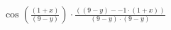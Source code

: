 $\cos({\frac{({1}+{x})}{({9}-{y})}})\cdot\frac{(({9}-{y})-{-1}\cdot({1}+{x}))}{({9}-{y})\cdot({9}-{y})}$